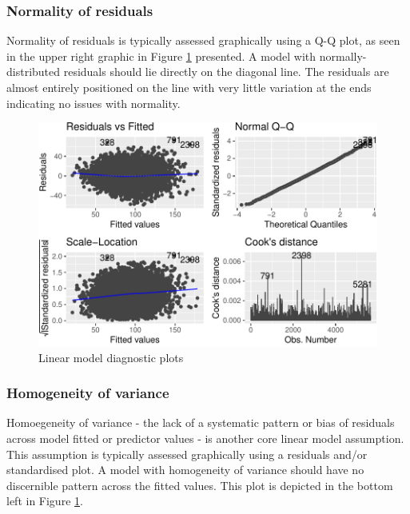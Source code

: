 \documentclass{article}
\begin{document}
\hypertarget{normality-of-residuals}{%
\subsubsection{Normality of residuals}\label{normality-of-residuals}}

Normality of residuals is typically assessed graphically using a Q-Q plot, as seen in the upper right graphic in Figure \ref{fig:diagnostics} presented. A model with normally-distributed residuals should lie directly on the diagonal line. The residuals are almost entirely positioned on the line with very little variation at the ends indicating no issues with normality.

\begin{figure}
\centering
\includegraphics{OLET5608_TrentHenderson_files/figure-latex/diagnostics-1.pdf}
\caption{\label{fig:diagnostics}Linear model diagnostic plots}
\end{figure}

\hypertarget{homogeneity-of-variance}{%
\subsubsection{Homogeneity of variance}\label{homogeneity-of-variance}}

Homoegeneity of variance - the lack of a systematic pattern or bias of residuals across model fitted or predictor values - is another core linear model assumption. This assumption is typically assessed graphically using a residuals and/or standardised plot. A model with homogeneity of variance should have no discernible pattern across the fitted values. This plot is depicted in the bottom left in Figure \ref{fig:diagnostics}.
\end{document}
